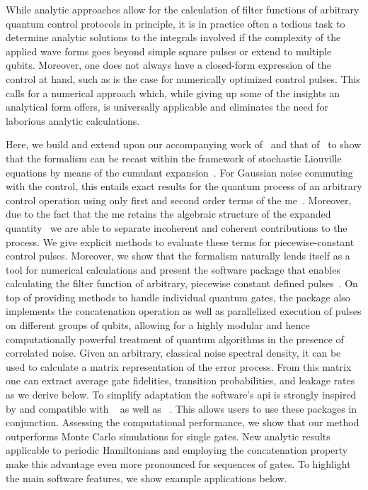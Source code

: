 While analytic approaches allow for the calculation of filter functions of arbitrary quantum control protocols in principle, it is in practice often a tedious task to determine analytic solutions to the integrals involved if the complexity of the applied wave forms goes beyond simple square pulses or extend to multiple qubits.
Moreover, one does not always have a closed-form expression of the control at hand, such as is the case for numerically optimized control pulses.
This calls for a numerical approach which, while giving up some of the insights an analytical form offers, is universally applicable and eliminates the need for laborious analytic calculations.

Here, we build and extend upon our accompanying work of~ and that of~ to show that the formalism can be recast within the framework of stochastic Liouville equations by means of the cumulant expansion~\cite{Kubo1962,Kubo1963,Fox1976,Bianucci2020}.
For Gaussian noise commuting with the control, this entails exact results for the quantum process of an arbitrary control operation using only first and second order terms of the \gls{me}~\cite{Magnus1954}.
Moreover, due to the fact that the \gls{me} retains the algebraic structure of the expanded quantity~\cite{Blanes2009} we are able to separate incoherent and coherent contributions to the process.
We give explicit methods to evaluate these terms for piecewise-constant control pulses.
Moreover, we show that the formalism naturally lends itself as a tool for numerical calculations and present the \filterfunctions \python software package that enables calculating the filter function of arbitrary, piecewise constant defined pulses~\cite{Hangleiter_ff}.
On top of providing methods to handle individual quantum gates, the package also implements the concatenation operation as well as parallelized execution of pulses on different groups of qubits, allowing for a highly modular and hence computationally powerful treatment of quantum algorithms in the presence of correlated noise.
Given an arbitrary, classical noise spectral density, it can be used to calculate a matrix representation of the error process.
From this matrix one can extract average gate fidelities, transition probabilities, and leakage rates as we derive below.
To simplify adaptation the software's \gls{api} is strongly inspired by and compatible with \qutip~\cite{Johansson2012} as well as \qopt~\cite{Teske2022a}.
This allows users to use these packages in conjunction.
Assessing the computational performance, we show that our method outperforms Monte Carlo simulations for single gates.
New analytic results applicable to periodic Hamiltonians and employing the concatenation property make this advantage even more pronounced for sequences of gates.
To highlight the main software features, we show example applications below.

